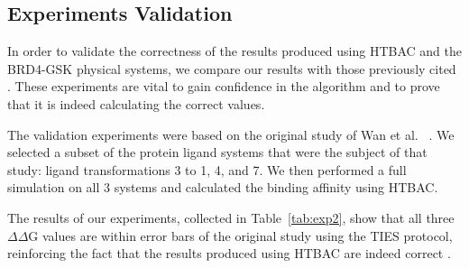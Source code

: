 \subsection{Experiments Validation}


In order to validate the correctness of the results produced using HTBAC and
the BRD4-GSK physical systems, we compare our results with those previously
cited . These experiments  are vital to gain confidence in
the algorithm  and to prove that it is indeed
calculating the correct values.

The validation experiments were based on the original study of Wan et
al.~\cite{Wan2017brd4} . We
selected a subset of the protein ligand systems that were the subject of that
study: ligand transformations 3 to 1, 4, and 7. We then performed a full
simulation on all 3 systems and calculated the binding affinity using HTBAC.

The results of our experiments, collected in Table~\ref{tab:exp2}, show that
all three $\Delta \Delta$G values are within error bars of the original study
using the TIES protocol, reinforcing  the fact that the
results produced using HTBAC are indeed correct
.

